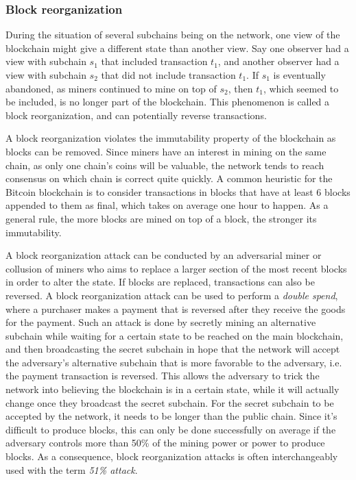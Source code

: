 \subsubsection{Block reorganization}
During the situation of several subchains being on the network, one view of the blockchain might give a different state than another view. Say one observer had a view with subchain $s_1$ that included transaction $t_1$, and another observer had a view with subchain $s_2$ that did not include transaction $t_1$. If $s_1$ is eventually abandoned, as miners continued to mine on top of $s_2$, then $t_1$, which seemed to be included, is no longer part of the blockchain. This phenomenon is called a block reorganization, and can potentially reverse transactions.

A block reorganization violates the immutability property of the blockchain as blocks can be removed. Since miners have an interest in mining on the same chain, as only one chain's coins will be valuable, the network tends to reach consensus on which chain is correct quite quickly. A common heuristic for the Bitcoin blockchain is to consider transactions in blocks that have at least 6 blocks appended to them as final, which takes on average one hour to happen. As a general rule, the more blocks are mined on top of a block, the stronger its immutability. 

A block reorganization attack can be conducted by an adversarial miner or collusion of miners who aims to replace a larger section of the most recent blocks in order to alter the state. If blocks are replaced, transactions can also be reversed. A block reorganization attack can be used to perform a \emph{double spend}, where a purchaser makes a payment that is reversed after they receive the goods for the payment. Such an attack is done by secretly mining an alternative subchain while waiting for a certain state to be reached on the main blockchain, and then broadcasting the secret subchain in hope that the network will accept the adversary's alternative subchain that is more favorable to the adversary, i.e. the payment transaction is reversed. This allows the adversary to trick the network into believing the blockchain is in a certain state, while it will actually change once they broadcast the secret subchain. For the secret subchain to be accepted by the network, it needs to be longer than the public chain. Since it's difficult to produce blocks, this can only be done successfully on average if the adversary controls more than 50\% of the mining power or power to produce blocks. As a consequence, block reorganization attacks is often interchangeably used with the term \emph{51\% attack}.

